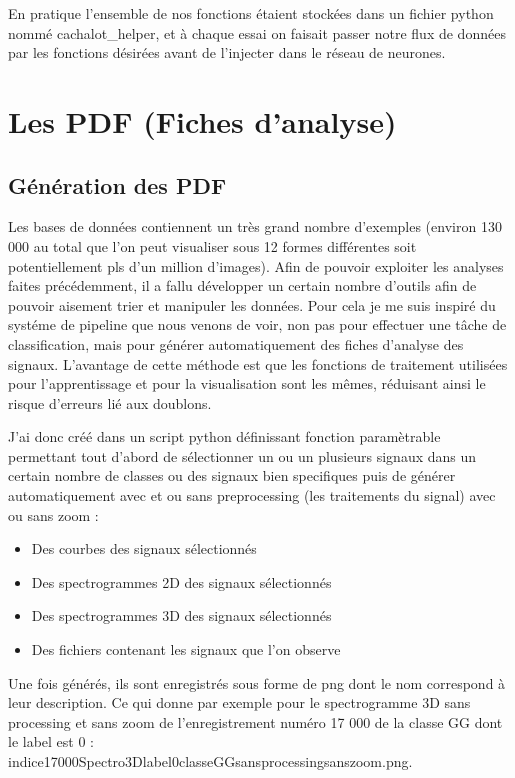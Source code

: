 En pratique l'ensemble de nos fonctions étaient stockées dans un fichier python nommé cachalot\_helper, et à chaque essai on faisait passer notre flux de données par les fonctions désirées avant de l'injecter dans le réseau de neurones.


\hypertarget{Les-PDF}{%
\section{Les PDF (Fiches d'analyse)}
\label{Les-PDF}}

\hypertarget{Guxe9nuxe9ration-des-PDF}{%
\subsection{Génération des PDF}
\label{Guxe9nuxe9ration-des-PDF}}

Les bases de données contiennent un très grand nombre d'exemples (environ 130 000 au total que l'on peut visualiser sous 12 formes différentes soit potentiellement pls d'un million d'images).
Afin de pouvoir exploiter les analyses faites précédemment,  il a fallu développer un certain nombre d'outils afin de pouvoir aisement trier et manipuler les données.
Pour cela je me suis inspiré du systéme de pipeline que nous venons de voir, non pas pour
effectuer une tâche de classification, mais pour générer automatiquement des fiches d'analyse
des signaux.
L'avantage de cette méthode est que les fonctions de traitement utilisées pour l'apprentissage et pour la visualisation sont les mêmes, réduisant ainsi le risque d'erreurs lié aux doublons.

J'ai donc créé dans un script python définissant fonction paramètrable permettant tout d'abord de sélectionner un ou un plusieurs signaux dans un certain nombre de classes ou des signaux bien specifiques puis de générer automatiquement avec et ou sans preprocessing (les traitements du signal) avec ou sans zoom :
\begin{itemize}
\item Des courbes des signaux sélectionnés
\item Des spectrogrammes 2D des signaux sélectionnés
\item Des spectrogrammes 3D des signaux sélectionnés
\item Des fichiers contenant les signaux que l'on observe
\end{itemize}
Une fois générés, ils sont enregistrés sous forme de png dont le nom correspond à leur description. Ce qui donne par exemple pour le spectrogramme 3D sans processing et sans zoom de l'enregistrement numéro 17 000 de la classe GG dont le label est 0 :\\
indice17000Spectro3Dlabel0classeGGsansprocessingsanszoom.png.

